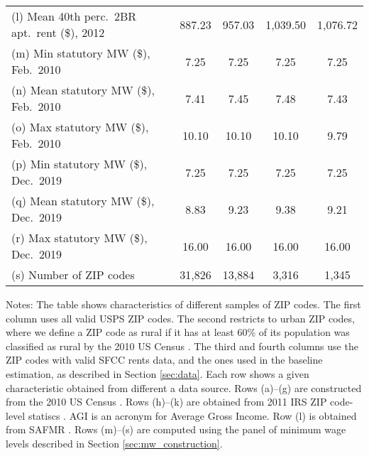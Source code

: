 \begin{landscape}
\begin{table}[hbt!]
\begin{tabular}{@{}lcccc@{}}
        (l) Mean 40th perc.\ 2BR apt.\ rent (\$), 2012   & 887.23   & 957.03  & 1,039.50  & 1,076.72     \\
        (m) Min statutory MW (\$), Feb.\ 2010            & 7.25   & 7.25  & 7.25  & 7.25                \\
        (n) Mean statutory MW (\$), Feb.\ 2010           & 7.41   & 7.45  & 7.48  & 7.43                \\
        (o) Max statutory MW (\$), Feb.\ 2010            & 10.10   & 10.10  & 10.10  & 9.79              \\
        (p) Min statutory MW (\$), Dec.\ 2019            & 7.25   & 7.25  & 7.25  & 7.25                 \\
        (q) Mean statutory MW (\$), Dec.\ 2019           & 8.83   & 9.23  & 9.38  & 9.21                 \\
        (r) Max statutory MW (\$), Dec.\ 2019            & 16.00   & 16.00  & 16.00  & 16.00              \\
        (s) Number of ZIP codes                          & 31,826  & 13,884 & 3,316 & 1,345               \\ \bottomrule
    \end{tabular}

    \begin{minipage}{.95\linewidth} \footnotesize
        \vspace{2mm}
        Notes: The table shows characteristics of different samples of ZIP codes.
        The first column uses all valid USPS ZIP codes.
        The second restricts to urban ZIP codes, where we define a ZIP code as 
        rural if it has at least 60\% of its population was classified as rural 
        by the 2010 US Census \parencite{CensusDecennial}.
        The third and fourth columns use the ZIP codes with valid SFCC rents 
        data, and the ones used in the baseline estimation, as described in
        Section \ref{sec:data}.
        Each row shows a given characteristic obtained from different a data 
        source.
        Rows (a)--(g) are constructed from the 2010 US Census \parencite{CensusDecennial}.
        Rows (h)--(k) are obtained from 2011 IRS ZIP code-level statiscs 
        \parencite{IRS}. AGI is an acronym for Average Gross Income.
        Row (l) is obtained from SAFMR \parencite{hudSAFMR}.
        Rows (m)--(s) are computed using the panel of minimum wage levels 
        described in Section \ref{sec:mw_construction}.
    \end{minipage}
\end{table}
\end{landscape}
